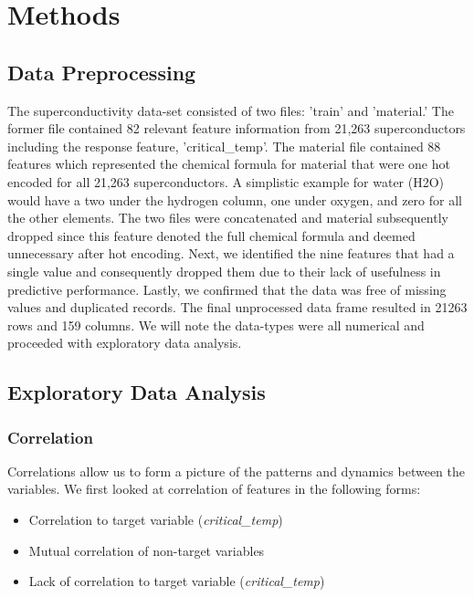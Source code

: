 \documentclass[twoside,twocolumn]{article}
\begin{document}

\section{Methods}

\subsection{Data Preprocessing}
The superconductivity data-set consisted of two files: 'train' and 'material.' The former file contained 82 relevant feature information from 21,263 superconductors including the response feature, 'critical\_temp'. The material file contained 88 features which represented the chemical formula for material that were one hot encoded for all 21,263 superconductors. A simplistic example for water (H2O) would have a two under the hydrogen column, one under oxygen, and zero for all the other elements. The two files were concatenated and material subsequently dropped since this feature denoted the full chemical formula and deemed unnecessary after hot encoding. Next, we identified the nine features that had a single value and consequently dropped them due to their lack of usefulness in predictive performance. Lastly, we confirmed that the data was free of missing values and duplicated records. The final unprocessed data frame resulted in 21263 rows and 159 columns. We will note the data-types were all numerical and proceeded with exploratory data analysis. 

\subsection{Exploratory Data Analysis}

\subsubsection{Correlation}
Correlations allow us to form a picture of the patterns and dynamics between the variables. We first looked at correlation of features in the following forms:
\begin{itemize}
\item Correlation to target variable (\emph{critical\_temp})
\item Mutual correlation of non-target variables
\item Lack of correlation to target variable (\emph{critical\_temp})
\end{itemize}
\end{document}
